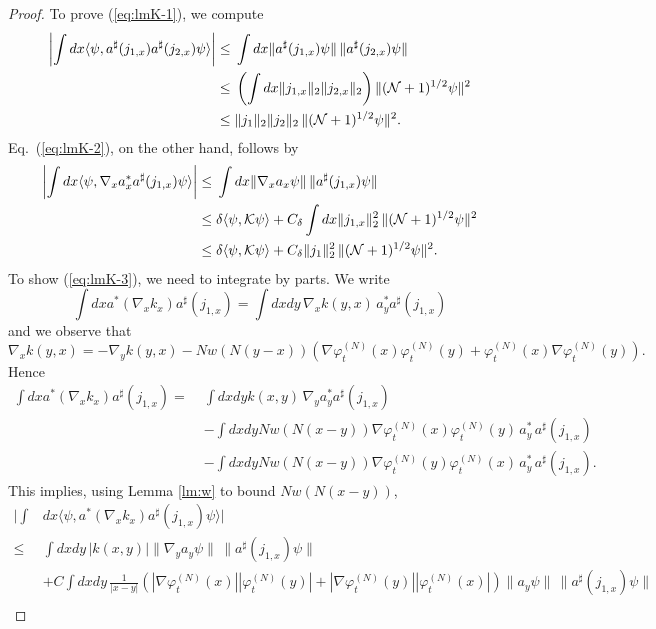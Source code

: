 \documentclass[11pt,a4paper]{article}
\newcommand{\cK}{{\cal K}}
\newcommand{\cN}{{\cal N}}
\begin{document}
\begin{proof}
To prove (\ref{eq:lmK-1}), we compute
\[ \begin{split}  \left| \int dx \langle \psi , a^\sharp (j_{1,x}) a^\sharp (j_{2,x}) \psi \rangle \right|  \leq  \; &\int dx \| a^\sharp (j_{1,x}) \psi \| \, \| a^\sharp (j_{2,x}) \psi \| \\ \leq \; &\left(\int dx \| j_{1,x} \|_2 \| j_{2,x} \|_2\right) \| (\cN+1)^{1/2} \psi \|^2 \\ \leq \; &\| j_1 \|_2 \| j_2 \|_2  \, \| (\cN+1)^{1/2} \psi \|^2. \end{split} \]
Eq.\ (\ref{eq:lmK-2}), on the other hand, follows by
\begin{equation} \begin{split}
\left| \int dx \langle \psi, \nabla_x a_x^* a^\sharp (j_{1,x}) \psi \rangle \right| \leq \; & \int dx \| \nabla_x a_x \psi \| \, \| a^\sharp (j_{1,x}) \psi \| \\ \leq \; &\delta \langle \psi, \cK \psi \rangle + C_\delta  \int dx \| j_{1,x} \|_2^2 \, \| (\cN+1)^{1/2} \psi \|^2 \\ \leq \; & \delta \langle \psi , \cK \psi \rangle + C_\delta \| j_1 \|^2_2 \, \| (\cN+1)^{1/2} \psi \|^2. \end{split} \end{equation}
To show (\ref{eq:lmK-3}), we need to integrate by parts. We write
\[ \int dx a^* (\nabla_x k_x) a^\sharp (j_{1,x})  = \int dx dy \, \nabla_x k (y,x) \, a^*_y  a^\sharp (j_{1,x}) \]
and we observe that
\[ \nabla_x k(y,x) = - \nabla_y k(y,x) - N w (N (y-x)) \left( \nabla
\varphi^{(N)}_t (x) \varphi^{(N)}_t (y) + \varphi_t^{(N)} (x) \nabla
\varphi_t^{(N)} (y) \right). \]
Hence
\[\begin{split} 
 \int dx a^* (\nabla_x k_x) a^\sharp (j_{1,x}) = \; & \int dx dy k (x,y) \, \nabla_y a^*_y  a^\sharp (j_{1,x}) 
\\ &- \int dx dy N w (N (x-y)) \nabla \varphi_t^{(N)} (x) \varphi_t^{(N)} (y) \, a^*_y  \, a^\sharp(j_{1,x})
\\& - \int dx dy N w (N (x-y)) \nabla \varphi_t^{(N)} (y) \varphi_t^{(N)} (x) \, a^*_y  \, a^\sharp(j_{1,x}).\end{split} \]
This implies, using Lemma \ref{lm:w} to bound $Nw(N(x-y))$,
\[ \begin{split}  \Big|  \int &dx \langle \psi,   a^* (\nabla_x k_x) a^\sharp (j_{1,x}) \psi \rangle \Big| \\ \leq \; & \int dx dy \, |k(x,y)| \| \nabla_y a_y \psi \| \, \| a^\sharp (j_{1,x}) \psi \| \\ &+ C \int dx dy \,  \frac{1}{|x-y|}  \left( |\nabla \varphi_t^{(N)} (x)| |\varphi^{(N)}_t (y)| +|\nabla \varphi_t^{(N)} (y)| |\varphi^{(N)}_t (x)| \right) \| a_y \psi \| \, \| a^\sharp (j_{1,x}) \psi \|  \\ 

\end{split}\]
\end{proof}
\end{document}
